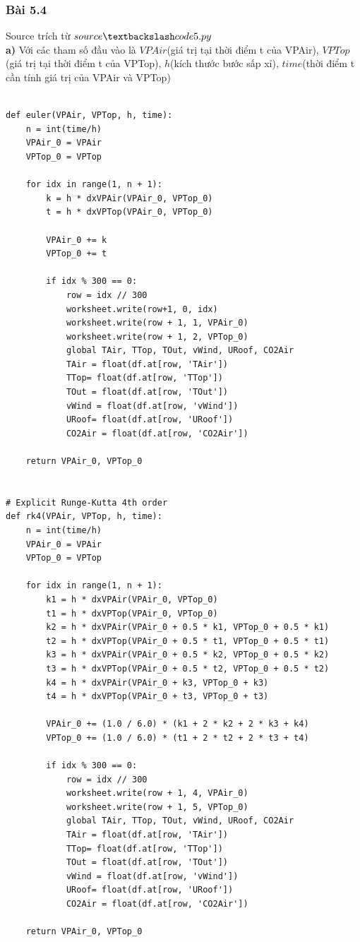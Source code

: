 \documentclass[a4paper]{article}
\begin{document}
\subsubsection{Bài 5.4}
Source trích từ $source\textbackslash code5.py$\\
\textbf{a)}
Với các tham số đầu vào là $VPAir$(giá trị tại thời điểm t của VPAir), $VPTop$(giá trị tại thời điểm t của VPTop), $h$(kích thước bước sấp xỉ), $time$(thời điểm t cần tính giá trị của VPAir và VPTop)
\begin{verbatim}
  
def euler(VPAir, VPTop, h, time):
    n = int(time/h)
    VPAir_0 = VPAir
    VPTop_0 = VPTop

    for idx in range(1, n + 1):
        k = h * dxVPAir(VPAir_0, VPTop_0)
        t = h * dxVPTop(VPAir_0, VPTop_0)

        VPAir_0 += k
        VPTop_0 += t

        if idx % 300 == 0:
            row = idx // 300
            worksheet.write(row+1, 0, idx)
            worksheet.write(row + 1, 1, VPAir_0)
            worksheet.write(row + 1, 2, VPTop_0)
            global TAir, TTop, TOut, vWind, URoof, CO2Air
            TAir = float(df.at[row, 'TAir'])
            TTop= float(df.at[row, 'TTop'])
            TOut = float(df.at[row, 'TOut'])
            vWind = float(df.at[row, 'vWind'])
            URoof= float(df.at[row, 'URoof'])
            CO2Air = float(df.at[row, 'CO2Air'])

    return VPAir_0, VPTop_0


# Explicit Runge-Kutta 4th order
def rk4(VPAir, VPTop, h, time):
    n = int(time/h)
    VPAir_0 = VPAir
    VPTop_0 = VPTop

    for idx in range(1, n + 1):
        k1 = h * dxVPAir(VPAir_0, VPTop_0)
        t1 = h * dxVPTop(VPAir_0, VPTop_0)
        k2 = h * dxVPAir(VPAir_0 + 0.5 * k1, VPTop_0 + 0.5 * k1)
        t2 = h * dxVPTop(VPAir_0 + 0.5 * t1, VPTop_0 + 0.5 * t1)
        k3 = h * dxVPAir(VPAir_0 + 0.5 * k2, VPTop_0 + 0.5 * k2)
        t3 = h * dxVPTop(VPAir_0 + 0.5 * t2, VPTop_0 + 0.5 * t2)
        k4 = h * dxVPAir(VPAir_0 + k3, VPTop_0 + k3)
        t4 = h * dxVPTop(VPAir_0 + t3, VPTop_0 + t3)

        VPAir_0 += (1.0 / 6.0) * (k1 + 2 * k2 + 2 * k3 + k4)
        VPTop_0 += (1.0 / 6.0) * (t1 + 2 * t2 + 2 * t3 + t4)

        if idx % 300 == 0:
            row = idx // 300
            worksheet.write(row + 1, 4, VPAir_0)
            worksheet.write(row + 1, 5, VPTop_0)
            global TAir, TTop, TOut, vWind, URoof, CO2Air
            TAir = float(df.at[row, 'TAir'])
            TTop= float(df.at[row, 'TTop'])
            TOut = float(df.at[row, 'TOut'])
            vWind = float(df.at[row, 'vWind'])
            URoof= float(df.at[row, 'URoof'])
            CO2Air = float(df.at[row, 'CO2Air'])

    return VPAir_0, VPTop_0
\end{verbatim}
\end{document}
